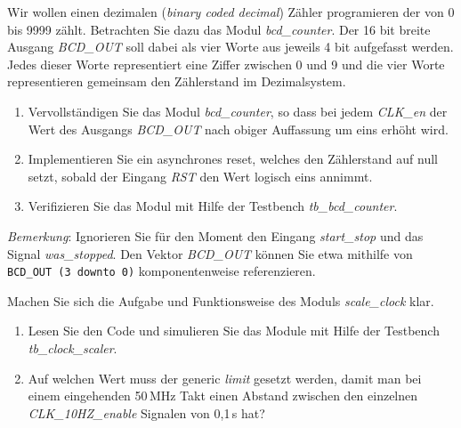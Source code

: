 \documentclass[12pt]{article}
\begin{document}


Wir wollen einen dezimalen (\textit{binary coded decimal}) Zähler programieren der von 0 bis 9999 zählt.
Betrachten Sie dazu das Modul \textit{bcd\_counter}. Der 16 bit breite Ausgang \textit{BCD\_OUT} soll dabei als vier Worte aus jeweils 4 bit aufgefasst werden. Jedes dieser Worte representiert eine Ziffer zwischen 0 und 9 und die vier Worte representieren gemeinsam den Zählerstand im Dezimalsystem.


\begin{enumerate}[label=\alph*.)]


\item Vervollständigen Sie das Modul \textit{bcd\_counter}, so dass bei jedem \textit{CLK\_en} der Wert des Ausgangs \textit{BCD\_OUT} nach obiger Auffassung um eins erhöht wird.


\item Implementieren Sie ein asynchrones reset, welches den Zählerstand auf null setzt, sobald der
Eingang \textit{RST} den Wert logisch eins annimmt.


\item Verifizieren Sie das Modul mit Hilfe der Testbench \textit{tb\_bcd\_counter}. 


\end{enumerate}


\textit{Bemerkung}: Ignorieren Sie für den Moment den Eingang \textit{start\_stop} und das Signal \textit{was\_stopped}. Den Vektor \textit{BCD\_OUT} können Sie etwa mithilfe von \glqq \texttt{BCD\_OUT (3 downto 0)}\grqq \,\,komponentenweise referenzieren.







Machen Sie sich die Aufgabe und Funktionsweise des Moduls \textit{scale\_clock} klar.


\begin{enumerate}[label=\alph*.)]


\item Lesen Sie den Code und simulieren Sie das Module mit Hilfe der Testbench \textit{tb\_clock\_scaler}.


\item Auf welchen Wert muss der generic \textit{limit} gesetzt werden, damit man bei
einem eingehenden 50\,MHz Takt einen Abstand zwischen den einzelnen \textit{CLK\_10HZ\_enable} Signalen von 0,1\,s hat?


\end{enumerate}
\end{document}
